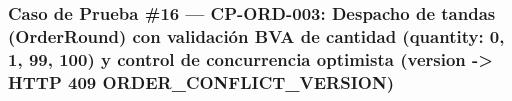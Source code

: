 \documentclass[10pt,a4paper]{article}
\begin{document}
\endgroup\medskip


\subsubsection{Caso de Prueba \#16 --- CP-ORD-003: Despacho de tandas (OrderRound) con validación BVA de cantidad (quantity: 0, 1, 99, 100) y control de concurrencia optimista (version -\textgreater{} HTTP 409 ORDER\_CONFLICT\_VERSION)}\label{caso-de-prueba-16--cp-ord-003-despacho-de-tandas-orderround-con-validaciuxf3n-bva-de-cantidad-quantity-0-1-99-100-y-control-de-concurrencia-optimista-version---http-409-order_conflict_version}

\begingroup\singlespacing\footnotesize\setlength{\parskip}{0pt}
\end{document}
